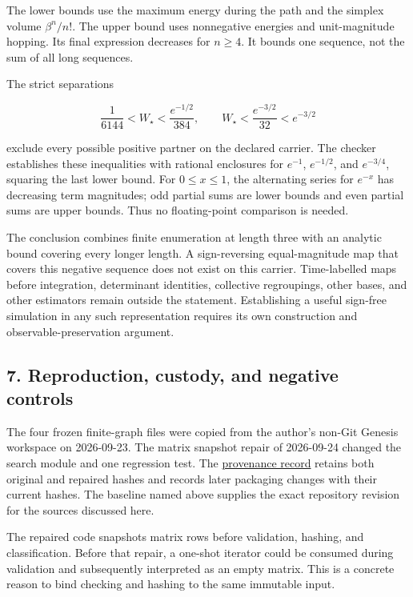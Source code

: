 \documentclass[
  11pt,
]{article}
\begin{document}
The lower bounds use the maximum energy during the path and the simplex
volume \(\beta^n/n!\). The upper bound uses nonnegative energies and
unit-magnitude hopping. Its final expression decreases for \(n\geq4\).
It bounds one sequence, not the sum of all long sequences.

The strict separations

\[
\frac1{6144}<W_\star<
\frac{e^{-1/2}}{384},\qquad
W_\star<\frac{e^{-3/2}}{32}<e^{-3/2}
\]

exclude every possible positive partner on the declared carrier. The
checker establishes these inequalities with rational enclosures for
\(e^{-1}\), \(e^{-1/2}\), and \(e^{-3/4}\), squaring the last lower
bound. For \(0\leq x\leq1\), the alternating series for \(e^{-x}\) has
decreasing term magnitudes; odd partial sums are lower bounds and even
partial sums are upper bounds. Thus no floating-point comparison is
needed.

The conclusion combines finite enumeration at length three with an
analytic bound covering every longer length. A sign-reversing
equal-magnitude map that covers this negative sequence does not exist on
this carrier. Time-labelled maps before integration, determinant
identities, collective regroupings, other bases, and other estimators
remain outside the statement. Establishing a useful sign-free simulation
in any such representation requires its own construction and
observable-preservation argument.

\subsection{7. Reproduction, custody, and negative
controls}\label{reproduction-custody-and-negative-controls}

The four frozen finite-graph files were copied from the author's non-Git
Genesis workspace on 2026-09-23. The matrix snapshot repair of
2026-09-24 changed the search module and one regression test. The
\href{https://github.com/dbccpage/the_symbol_game/blob/c819bec432446dd3c9b1edf1583384cfe76c6c71/omega_engine_atlas/coda_atlas/omega_engine_symbol_game/002_pfp_signed_presentations_and_search_frontier/code/PROVENANCE.md}{provenance
record} retains both original and repaired hashes and records later
packaging changes with their current hashes. The baseline named above
supplies the exact repository revision for the sources discussed here.

The repaired code snapshots matrix rows before validation, hashing, and
classification. Before that repair, a one-shot iterator could be
consumed during validation and subsequently interpreted as an empty
matrix. This is a concrete reason to bind checking and hashing to the
same immutable input.
\end{document}
